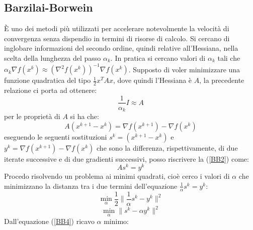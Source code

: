 \documentclass{report}
\begin{document}
\subsection{Barzilai-Borwein}
\`E uno dei metodi più utilizzati per accelerare notevolmente la velocità di convergenza senza dispendio in termini di risorse di calcolo. Si cercano di inglobare informazioni del secondo ordine, quindi relative all'Hessiana, nella scelta della lunghezza del passo $\alpha_k$. In pratica si cercano valori di $\alpha_k$ tali che $\alpha_k \nabla f(x^k) \approx (\nabla^2 f(x^k))^{-1}  \nabla f(x^k)$. Supposto di voler minimizzare una funzione quadratica del tipo $\frac{1}{2} x^T A x$, dove quindi l'Hessiana è $A$, la precedente relazione ci porta ad ottenere:
\begin{equation}
    \label{BB1}
        \frac{1}{\alpha_k} I \approx A	
\end{equation}
per le proprietà di $A$ si ha che:
\begin{equation}
    \label{BB2}
        A (x^{k+1} - x^{k}) = \nabla f(x^{k+1}) -\nabla f( x^{k} )
\end{equation}
eseguendo le seguenti sostituzioni $s^k =(x^{k+1} - x^{k})$ e $y^k=\nabla f(x^{k+1}) -\nabla f( x^{k} )$ che sono la differenza, rispettivamente, di due iterate successive e di due gradienti successivi, posso riscrivere la (\ref{BB2}) come:
\begin{equation}
    \label{BB3}
        A s^k = y^k
\end{equation}
Procedo risolvendo un problema ai minimi quadrati, cioè cerco i valori di $\alpha$ che minimizzano la distanza tra i due termini dell'equazione $\frac{1}{\alpha}  s^k = y^k$:
\begin{equation} 
\label{BB4}
\min_{\alpha} \frac{1}{2} \|\frac{1}{\alpha} s^k - y^k\|^2 
\end{equation}
\begin{equation} 
\label{BB5}
\min_{\alpha} \| s^k -\alpha y^k\|^2 
\end{equation}
Dall'equazione (\ref{BB4}) ricavo $\alpha$ minimo:
\end{document}
